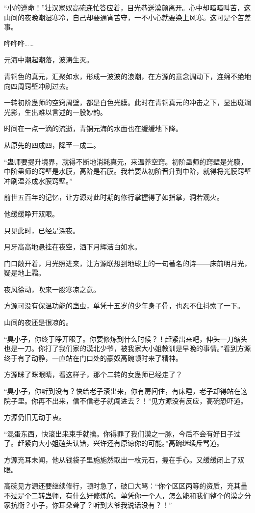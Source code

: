 \begin{this_body}
“小的遵命！”壮汉家奴高碗连忙答应着，目光恭送漠颜离开。心中却暗暗叫苦，这山间的夜晚潮湿寒冷，自己却要通宵苦守，一不小心就要染上风寒。这可是个苦差事。

哗哗哗……

元海中潮起潮落，波涛生灭。

青铜色的真元，汇聚如水，形成一波波的浪潮，在方源的意念调动下，连绵不绝地向四周窍壁冲刷过去。

一转初阶蛊师的空窍周壁，都是白色光膜。此时在青铜真元的冲击之下，显出斑斓光影，生出难以言述的一股妙韵。

时间在一点一滴的流逝，青铜元海的水面也在缓缓地下降。

从原先的四成四，降至一成二。

“蛊师要提升境界，就得不断地消耗真元，来温养空窍。初阶蛊师的窍壁是光膜，中阶蛊师的窍壁是水膜，高阶是石膜。我若要从初阶晋升到中阶，就得将光膜窍壁冲刷温养成水膜窍壁。”

前世五百年的记忆，让方源对此时期的修行掌握得了如指掌，洞若观火。

他缓缓睁开双眼。

只见此时，已经是深夜。

月牙高高地悬挂在夜空，洒下月辉洁白如水。

门口敞开着，月光照进来，让方源联想到地球上的一句著名的诗——床前明月光，疑是地上霜。

夜风徐动，吹来一股寒凉之意。

方源可没有保温功能的蛊虫，单凭十五岁的少年身子骨，也忍不住抖索了一下。

山间的夜还是很凉的。

“臭小子，你终于睁开眼了。你要修炼到什么时候？！赶紧出来吧，伸头一刀缩头也是一刀。你打了我们家的漠北少爷，被我家大小姐教训是早晚的事情。”看到方源终于有了动静，一直站在门口处的豪奴高碗顿时来了精神。

方源眯了眯眼睛，看这样子，那个二转的女蛊师已经走了？

“臭小子，你听到没有？快给老子滚出来，你有房间住，有床睡，老子却得站在这院子里。你再不出来，信不信老子就闯进去？！”见方源没有反应，高碗恐吓道。

方源仍旧无动于衷。

“混蛋东西，快滚出来束手就擒。你得罪了我们漠之一脉，今后不会有好日子过了。赶紧向大小姐磕头认错，兴许还有原谅你的可能。”高碗继续斥骂道。

方源充耳未闻，他从钱袋子里施施然取出一枚元石，握在手心。又缓缓闭上了双眼。

高碗见方源还要继续修行，顿时急了，破口大骂：“你个区区丙等的资质，充其量不过是个二转蛊师，有什么好修炼的。单凭你一个人，怎么能和我们整个的漠之分家抗衡？小子，你耳朵聋了？听到大爷我说话没有？！”

\end{this_body}

